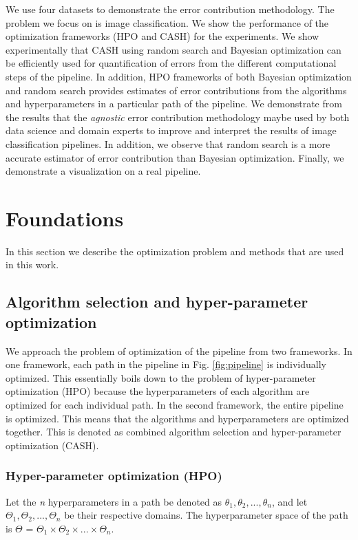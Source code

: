 We use four datasets to demonstrate the error contribution methodology. The problem we focus on is image classification. We show the performance of the optimization frameworks (HPO and CASH) for the experiments. We show experimentally that CASH using random search and Bayesian optimization can be efficiently used for quantification of errors from the different computational steps of the pipeline. In addition, HPO frameworks of both Bayesian optimization and random search provides  estimates of error contributions from the algorithms and hyperparameters in a particular path of the pipeline.
We demonstrate from the results that the \textit{agnostic} error contribution methodology maybe used by both data science and domain experts to improve and interpret the results of image classification pipelines. In addition, we observe that random search is a more accurate estimator of error contribution than Bayesian optimization. Finally, we demonstrate a visualization on a real pipeline.

\section{Foundations}
\label{sec2}
In this section we describe the optimization problem and methods that are used in this work. 
\subsection{Algorithm selection and hyper-parameter optimization}
\label{subsec_AS_HPO}
We approach the problem of optimization of the pipeline from two frameworks. In one framework, each path in the pipeline in Fig. \ref{fig:pipeline} is individually optimized. This essentially boils down to the problem of hyper-parameter optimization (HPO)  because the hyperparameters of each algorithm are optimized for each individual path. In the second framework, the entire pipeline is optimized. This means that the algorithms and hyperparameters are optimized together. This is denoted as combined algorithm selection and hyper-parameter optimization (CASH).

\subsubsection{Hyper-parameter optimization (HPO)}
\label{subsubsec_HPO}
Let the \textit{n} hyperparameters in a path be denoted as $\theta_1, \theta_2, ..., \theta_n$, and let $\Theta_1, \Theta_2, ..., \Theta_n$ be their respective domains. The hyperparameter space of the path is  \textbf{$\Theta$} = $\Theta_1 \times \Theta_2 \times ... \times \Theta_n$.


